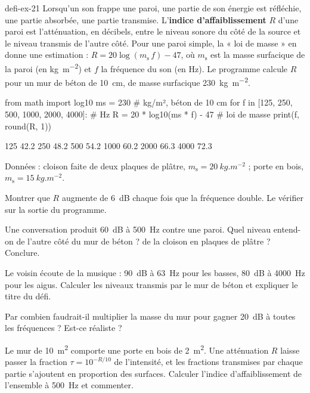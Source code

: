 \begin{blocEdition}{defi-ex-21}
Lorsqu'un son frappe une paroi, une partie de son énergie est réfléchie, une partie absorbée, une partie transmise.
L'\textbf{indice d'affaiblissement} $R$ d'une paroi est l'atténuation, en décibels, entre le niveau sonore du côté de la
source et le niveau transmis de l'autre côté. Pour une paroi simple, la « loi de masse » en donne une estimation :
$R=20\log(m_\mathrm{s}\,f)-47$, où $m_\mathrm{s}$ est la masse surfacique de la paroi (en \unit{kg.m^{-2}}) et $f$ la fréquence
du son (en Hz). Le programme calcule $R$ pour un mur de béton de \qty{10}{cm}, de masse surfacique \qty{230}{kg.m^{-2}}.
\begin{codecote}[0.66]
\begin{pythoncol}
from math import log10
ms = 230                     # kg/m², béton de 10 cm
for f in [125, 250, 500, 1000, 2000, 4000]:   # Hz
    R = 20 * log10(ms * f) - 47   # loi de masse
    print(f, round(R, 1))
\end{pythoncol}
\cote
\begin{consolecol}
125 42.2
250 48.2
500 54.2
1000 60.2
2000 66.3
4000 72.3
\end{consolecol}
\end{codecote}
\par\smallskip
Données : cloison faite de deux plaques de plâtre, $m_\mathrm{s}=\qty{20}{kg.m^{-2}}$ ; porte en bois, $m_\mathrm{s}=\qty{15}{kg.m^{-2}}$.
\begin{questions}
\item Montrer que $R$ augmente de \qty{6}{dB} chaque fois que la fréquence double. Le vérifier sur la sortie du programme.
\item Une conversation produit \qty{60}{dB} à \qty{500}{Hz} contre une paroi. Quel niveau entend-on de l'autre côté du mur de
béton ? de la cloison en plaques de plâtre ? Conclure.
\item Le voisin écoute de la musique : \qty{90}{dB} à \qty{63}{Hz} pour les basses, \qty{80}{dB} à \qty{4000}{Hz} pour les aigus.
Calculer les niveaux transmis par le mur de béton et expliquer le titre du défi.
\item Par combien faudrait-il multiplier la masse du mur pour gagner \qty{20}{dB} à toutes les fréquences ? Est-ce réaliste ?
\item Le mur de \qty{10}{m^2} comporte une porte en bois de \qty{2}{m^2}. Une atténuation $R$ laisse passer la fraction
$\tau=10^{-R/10}$ de l'intensité, et les fractions transmises par chaque partie s'ajoutent en proportion des surfaces.
Calculer l'indice d'affaiblissement de l'ensemble à \qty{500}{Hz} et commenter.
\end{questions}
\end{blocEdition}

